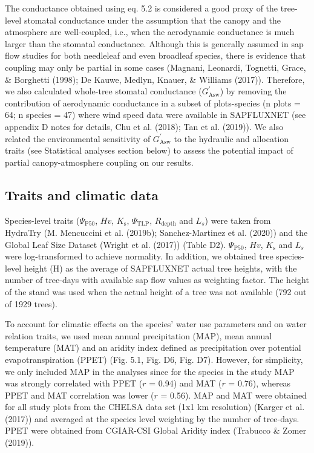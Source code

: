 \documentclass[11pt,twoside]{reedthesis}
\begin{document}
The conductance obtained using eq. 5.2 is considered a good proxy of the
tree-level stomatal conductance under the assumption that the canopy and
the atmosphere are well-coupled, i.e., when the aerodynamic conductance
is much larger than the stomatal conductance. Although this is generally
assumed in sap flow studies for both needleleaf and even broadleaf
species, there is evidence that coupling may only be partial in some
cases (Magnani, Leonardi, Tognetti, Grace, \& Borghetti (1998); De
Kauwe, Medlyn, Knauer, \& Williams (2017)). Therefore, we also
calculated whole-tree stomatal conductance (\(G_{\text{Asw}}^{'}\)) by
removing the contribution of aerodynamic conductance in a subset of
plots-species (n plots = 64; n species = 47) where wind speed data were
available in SAPFLUXNET (see appendix D notes for details, Chu et al.
(2018); Tan et al. (2019)). We also related the environmental
sensitivity of \(G_{\text{Asw}}^{'}\) to the hydraulic and allocation
traits (see Statistical analyses section below) to assess the potential
impact of partial canopy-atmosphere coupling on our results.\par

\subsection{Traits and climatic data}\label{traits-and-climatic-data}

Species-level traits (\textbar{}\(\Psi_{\text{P50}}\)\textbar{}, \(Hv\),
\(K_\text{s}\), \textbar{}\(\Psi_{\text{TLP}}\)\textbar{},
\(R_{\text{depth}}\) and \(L_s\)) were taken from HydraTry (M.
Mencuccini et al. (2019b); Sanchez-Martinez et al. (2020)) and the
Global Leaf Size Dataset (Wright et al. (2017)) (Table D2).
\textbar{}\(\Psi_{\text{P50}}\)\textbar{}, \(Hv\), \(K_\text{s}\) and
\(L_s\) were log-transformed to achieve normality. In addition, we
obtained tree species-level height (H) as the average of SAPFLUXNET
actual tree heights, with the number of tree-days with available sap
flow values as weighting factor. The height of the stand was used when
the actual height of a tree was not available (792 out of 1929
trees).\par

To account for climatic effects on the species' water use parameters and
on water relation traits, we used mean annual precipitation (MAP), mean
annual temperature (MAT) and an aridity index defined as precipitation
over potential evapotranspiration (PPET) (Fig. 5.1, Fig. D6, Fig. D7).
However, for simplicity, we only included MAP in the analyses since for
the species in the study MAP was strongly correlated with PPET (\(r\) =
0.94) and MAT (\(r\) = 0.76), whereas PPET and MAT correlation was lower
(\(r\) = 0.56). MAP and MAT were obtained for all study plots from the
CHELSA data set (1x1 km resolution) (Karger et al. (2017)) and averaged
at the species level weighting by the number of tree-days. PPET were
obtained from CGIAR-CSI Global Aridity index (Trabucco \& Zomer
(2019)).\par
\end{document}
